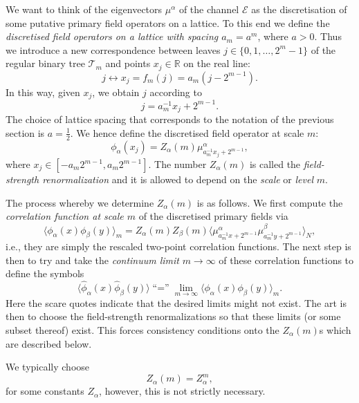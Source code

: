 \documentclass[11pt,oneside]{amsart}
\theoremstyle{plain}%
\theoremstyle{definition}
\theoremstyle{remark}
\begin{document}
We want to think of the eigenvectors $\mu^\alpha$ of the channel $\mathcal{E}$ as the discretisation of some putative primary field operators on a lattice. To this end we define the \emph{discretised field operators on a lattice with spacing $a_m = a^{m}$}, where $a > 0$. Thus we introduce a new correspondence between leaves $j\in\{0,1,\ldots, 2^m-1\}$ of the regular binary tree $\mathcal{T}_m$ and points $x_j\in\mathbb{R}$ on the real line:
\begin{equation}
	j \leftrightarrow x_j = f_m(j) = a_m (j - 2^{m-1}).
\end{equation}
In this way, given $x_j$, we obtain $j$ according to
\begin{equation}
	j = a_m^{-1} x_j + 2^{m-1}.
\end{equation}
The choice of lattice spacing that corresponds to the notation of the previous section is $a=\tfrac12$. We hence define the discretised field operator at scale $m$:
\begin{equation}
	\phi_\alpha (x_j) = Z_\alpha(m)\mu_{a_m^{-1} x_j + 2^{m-1}}^{\alpha},
\end{equation}
where $x_j \in [-a_m2^{m-1}, a_m2^{m-1}]$. The number $Z_\alpha(m)$ is called the \emph{field-strength renormalization} and it is allowed to depend on the \emph{scale} or \emph{level} $m$.

The process whereby we determine $Z_\alpha(m)$ is as follows. We first compute the \emph{correlation function at scale $m$} of the discretised primary fields via
\begin{equation}
	\langle \phi_\alpha (x)\phi_\beta (y)\rangle_m = Z_\alpha(m)Z_\beta(m)\langle \mu^\alpha_{a_m^{-1} x + 2^{m-1}} \mu^\beta_{a_m^{-1} y + 2^{m-1}}\rangle_N,
\end{equation}
i.e., they are simply the rescaled two-point correlation functions. The next step is then to try and take the \emph{continuum limit} $m\rightarrow \infty$ of these correlation functions to define the symbols
\begin{equation}
	\langle \hat{\phi}_\alpha (x)\hat{\phi}_\beta (y)\rangle \text{``$=$''} \lim_{m\rightarrow \infty}\langle \phi_\alpha (x)\phi_\beta (y)\rangle_m.
\end{equation}
Here the scare quotes indicate that the desired limits might not exist. The art is then to choose the field-strength renormalizations so that these limits (or some subset thereof) exist. This forces consistency conditions onto the $Z_\alpha(m)$s which are described below.

We typically choose
\begin{equation}
	Z_\alpha(m) = Z_\alpha^m,
\end{equation}
for some constants $Z_\alpha$, however, this is not strictly necessary.
\end{document}

